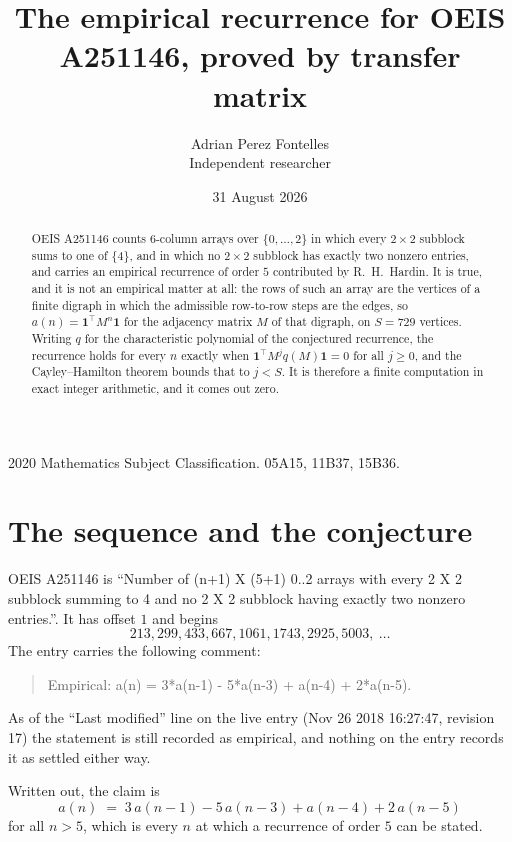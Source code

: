 \documentclass[11pt,a4paper]{article}
\title{The empirical recurrence for OEIS A251146, proved by transfer matrix}
\author{Adrian Perez Fontelles\\ \small Independent researcher}
\date{31 August 2026}
\theoremstyle{plain}
\theoremstyle{definition}
\begin{document}
\maketitle

\begin{abstract}
OEIS A251146 counts $6$-column arrays over $\{0,\dots,2\}$ in which every
$2\times2$ subblock sums to one of $\{4\}$, and in which no $2\times2$ subblock has exactly two nonzero entries, and carries an empirical
recurrence of order $5$ contributed by R.~H.~Hardin. It is true, and it is not an
empirical matter at all: the rows of such an array are the vertices of a finite digraph in
which the admissible row-to-row steps are the edges, so $a(n)=\mathbf{1}^{\!\top}M^{n}
\mathbf{1}$ for the adjacency matrix $M$ of that digraph, on $S=729$ vertices. Writing
$q$ for the characteristic polynomial of the conjectured recurrence, the recurrence holds
for every $n$ exactly when $\mathbf{1}^{\!\top}M^{j}q(M)\mathbf{1}=0$ for all
$j\ge0$, and the Cayley--Hamilton theorem bounds that to $j<S$. It is therefore a finite
computation in exact integer arithmetic, and it comes out zero.
\end{abstract}

\noindent\small 2020 Mathematics Subject Classification. 05A15, 11B37, 15B36.\normalsize

\section{The sequence and the conjecture}

OEIS A251146 is ``Number of (n+1) X (5+1) 0..2 arrays with every 2 X 2 subblock summing to 4 and no 2 X 2 subblock having exactly two nonzero entries.''. It has offset $1$
and begins
\[
213, 299, 433, 667, 1061, 1743, 2925, 5003,\ \dots
\]
The entry carries the following comment:
\begin{quote}\small
Empirical: a(n) = 3*a(n-1) - 5*a(n-3) + a(n-4) + 2*a(n-5).
\end{quote}
As of the ``Last modified'' line on the live entry (Nov 26 2018 16:27:47, revision 17) the statement is
still recorded as empirical, and nothing on the entry records it as settled either way.

Written out, the claim is
\begin{equation}\label{eq:conj}
a(n)\;=\;3\,a(n-1) - 5\,a(n-3) + a(n-4) + 2\,a(n-5)
\end{equation}
for all $n>5$, which is every $n$ at which a recurrence of order $5$ can be
stated.
\end{document}
